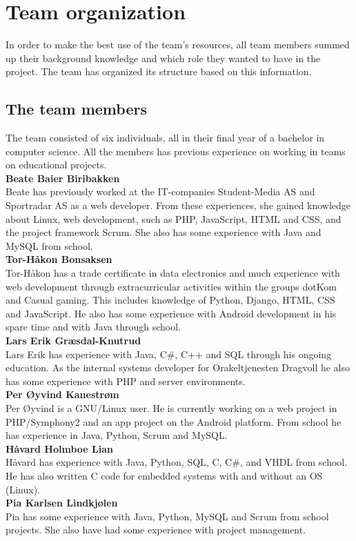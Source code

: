 \newpage
\section{Team organization}
In order to make the best use of the team's resources, all team members summed up their background knowledge and which role they wanted to have in the project. The team has organized its structure based on this information.

\subsection{The team members}
The team consisted of six individuals, all in their final year of a bachelor in computer science. All the members has previous experience on working in teams on educational projects.\\

\noindent\textbf{Beate Baier Biribakken}\\
Beate has previously worked at the IT-companies Student-Media AS and Sportradar AS as a web developer. From these experiences, she gained knowledge about Linux, web development, such as PHP, JavaScript, HTML and CSS, and the project framework Scrum. She also has some experience with Java and MySQL from school.\\

\noindent\textbf{Tor-Håkon Bonsaksen}\\
Tor-Håkon has a trade certificate in data electronics and much experience with web development through extracurricular activities within the groups dotKom and Casual gaming. This includes knowledge of Python, Django, HTML, CSS and JavaScript. He also has some experience with Android development in his spare time and with Java through school.\\

\noindent\textbf{Lars Erik Græsdal-Knutrud}\\
Lars Erik has experience with Java, C\#, C++ and SQL through his ongoing education. As the internal systems developer for Orakeltjenesten Dragvoll he also has some experience with PHP and server environments. \\

\noindent\textbf{Per Øyvind Kanestrøm}\\
Per Øyvind is a GNU/Linux user. He is currently working on a web project in PHP/Symphony2 and an app project on the Android platform. From school he has experience in Java, Python, Scrum and MySQL.\\

\noindent\textbf{Håvard Holmboe Lian}\\
Håvard has experience with Java, Python, SQL, C, C\#, and VHDL from school. He has also written C code for embedded systems with and without an OS (Linux).\\ 

\noindent\textbf{Pia	Karlsen	Lindkjølen}\\
Pia has some experience with Java, Python, MySQL and Scrum from school projects. She also have had some experience with project management. 